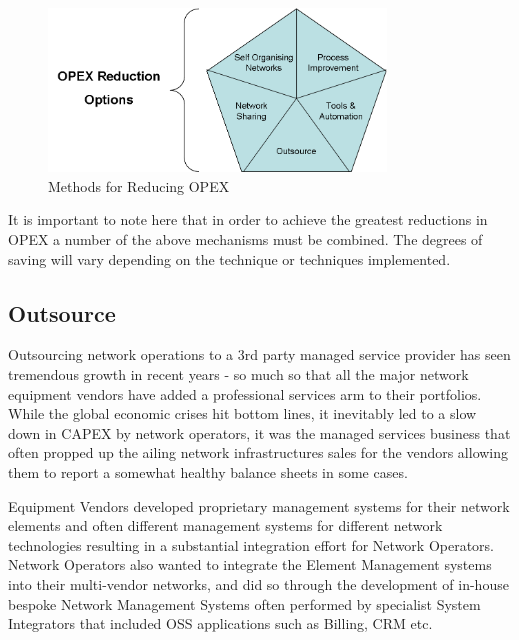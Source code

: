 \begin{figure}
	\begin{center}
		\includegraphics[width=0.8\textwidth]{figures/fig2}
		\caption{Methods for Reducing OPEX}
		\label{fig:opex}
	\end{center}
\end{figure}

It is important to note here that in order to achieve the greatest reductions in OPEX a number of the above mechanisms must be combined. The degrees of saving will vary depending on the technique or techniques implemented. 

\subsection{Outsource}
Outsourcing network operations to a 3rd party managed service provider has seen tremendous growth in recent years - so much so that all the major network equipment vendors have added a professional services arm to their portfolios. While the global economic crises hit bottom lines, it inevitably led to a slow down in CAPEX by network operators, it was the managed services business that often propped up the ailing network infrastructures sales for the vendors allowing them to report a somewhat healthy balance sheets in some cases.

Equipment Vendors developed proprietary management systems for their network elements and often different management systems for different network technologies resulting in a substantial integration effort for Network Operators. Network Operators also wanted to integrate the Element Management systems into their multi-vendor networks, and did so through the development of in-house bespoke Network Management Systems often performed by specialist System Integrators that included OSS applications such as Billing, CRM etc. 

